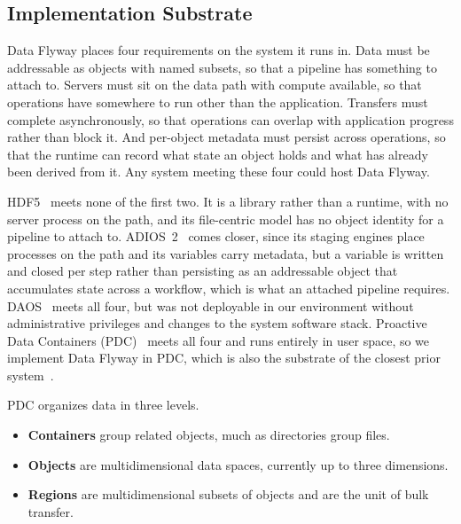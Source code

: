 \subsection{Implementation Substrate}

Data Flyway places four requirements on the system it runs in. Data must be addressable as objects with named subsets, so that a pipeline has something to attach to. Servers must sit on the data path with compute available, so that operations have somewhere to run other than the application. Transfers must complete asynchronously, so that operations can overlap with application progress rather than block it. And per-object metadata must persist across operations, so that the runtime can record what state an object holds and what has already been derived from it. Any system meeting these four could host Data Flyway.

HDF5~\cite{hdf5} meets none of the first two. It is a library rather than a runtime, with no server process on the path, and its file-centric model has no object identity for a pipeline to attach to. ADIOS~2~\cite{godoy2020adios2} comes closer, since its staging engines place processes on the path and its variables carry metadata, but a variable is written and closed per step rather than persisting as an addressable object that accumulates state across a workflow, which is what an attached pipeline requires. DAOS~\cite{breitenfeld2017daos} meets all four, but was not deployable in our environment without administrative privileges and changes to the system software stack. Proactive Data Containers (PDC)~\cite{tang2018toward} meets all four and runs entirely in user space, so we implement Data Flyway in PDC, which is also the substrate of the closest prior system~\cite{ravi2023runway}.

PDC organizes data in three levels.

\begin{itemize}
    \item \textbf{Containers} group related objects, much as directories group files.
    \item \textbf{Objects} are multidimensional data spaces, currently up to three dimensions.
    \item \textbf{Regions} are multidimensional subsets of objects and are the unit of bulk transfer.
\end{itemize}

